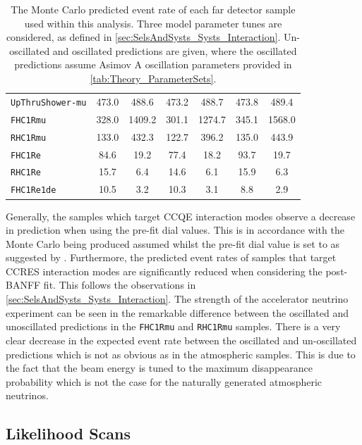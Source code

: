 \begin{table}[ht!]
\begin{tabular}{|l|c|c|c|c|c|c|}
      \texttt{UpThruShower-mu} & 473.0 & 488.6 & 473.2 & 488.7 & 473.8 & 489.4 \\
      \texttt{FHC1Rmu} & 328.0 & 1409.2 & 301.1 & 1274.7 & 345.1 & 1568.0 \\
      \texttt{RHC1Rmu} & 133.0 & 432.3 & 122.7 & 396.2 & 135.0 & 443.9 \\
      \texttt{FHC1Re} & 84.6 & 19.2 & 77.4 & 18.2 & 93.7 & 19.7 \\
      \texttt{RHC1Re} & 15.7 & 6.4 & 14.6 & 6.1 & 15.9 & 6.3 \\
      \texttt{FHC1Re1de} & 10.5 & 3.2 & 10.3 & 3.1 & 8.8 & 2.9 \\
      \hline
      \hline
    \end{tabular}
    \caption{The Monte Carlo predicted event rate of each far detector sample used within this analysis. Three model parameter tunes are considered, as defined in \autoref{sec:SelsAndSysts_Systs_Interaction}. Un-oscillated and oscillated predictions are given, where the oscillated predictions assume Asimov A oscillation parameters provided in \autoref{tab:Theory_ParameterSets}.}
    \label{tab:OscillationAnalysis_MCPred}
\end{table}

Generally, the samples which target CCQE interaction modes observe a decrease in prediction when using the pre-fit dial values. This is in accordance with the Monte Carlo being produced assumed  \cite{Aguilar_Arevalo_2010} whilst the pre-fit dial value is set to  as suggested by \cite{t2k_tn_344}. Furthermore, the predicted event rates of samples that target CCRES interaction modes are significantly reduced when considering the post-BANFF fit. This follows the observations in \autoref{sec:SelsAndSysts_Systs_Interaction}. The strength of the accelerator neutrino experiment can be seen in the remarkable difference between the oscillated and unoscillated predictions in the \texttt{FHC1Rmu} and \texttt{RHC1Rmu} samples. There is a very clear decrease in the expected event rate between the oscillated and un-oscillated predictions which is not as obvious as in the atmospheric samples. This is due to the fact that the beam energy is tuned to the maximum disappearance probability which is not the case for the naturally generated atmospheric neutrinos.

\subsection{Likelihood Scans}
\label{sec:OscillationAnalysis_LLHScans}

